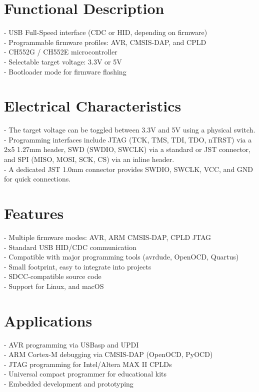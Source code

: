 \documentclass[10pt]{article}
\begin{document}
\vspace{1.0em}
\FloatBarrier %



\section*{Functional Description}
- USB Full-Speed interface (CDC or HID, depending on firmware)\\ 
- Programmable firmware profiles: AVR, CMSIS-DAP, and CPLD\\ 
- CH552G / CH552E microcontroller\\ 
- Selectable target voltage: 3.3V or 5V\\ 
- Bootloader mode for firmware flashing\\ 

\section*{Electrical Characteristics}
- The target voltage can be toggled between 3.3V and 5V using a physical switch.\\ 
- Programming interfaces include JTAG (TCK, TMS, TDI, TDO, nTRST) via a 2x5 1.27mm header, SWD (SWDIO, SWCLK) via a standard or JST connector, and SPI (MISO, MOSI, SCK, CS) via an inline header.\\ 
- A dedicated JST 1.0mm connector provides SWDIO, SWCLK, VCC, and GND for quick connections.\\ 

\section*{Features}
- Multiple firmware modes: AVR, ARM CMSIS-DAP, CPLD JTAG\\ 
- Standard USB HID/CDC communication\\ 
- Compatible with major programming tools (avrdude, OpenOCD, Quartus)\\ 
- Small footprint, easy to integrate into projects\\ 
- SDCC-compatible source code\\ 
- Support for Linux, and macOS\\ 



\section*{Applications}
- AVR programming via USBasp and UPDI\\ 
- ARM Cortex-M debugging via CMSIS-DAP (OpenOCD, PyOCD)\\ 
- JTAG programming for Intel/Altera MAX II CPLDs\\ 
- Universal compact programmer for educational kits\\ 
- Embedded development and prototyping\\ 
\end{document}
